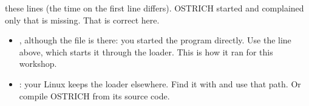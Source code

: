 \see these lines (the time on the first line differs). OSTRICH started and complained only that  is missing.
That is correct here.
\begin{trouble}
\begin{itemize}
\item {}, although the file is there: you started the program directly. Use the
   line above, which starts it through the loader. This is how it ran for this workshop.
\item {}: your Linux keeps the loader elsewhere. Find it with
   and use that path. Or compile OSTRICH from its source code.
\end{itemize}
\end{trouble}
